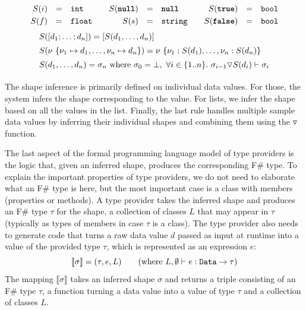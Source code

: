 \documentclass[fleqn,11pt]{report}
\newcommand{\kvd}[1]{\textnormal{\ttfamily\bfseries #1}}
\newcommand{\ident}[1]{\textnormal{\ttfamily #1}}
\theoremstyle{definition}
\newcommand{\sem}[1]{\llbracket #1 \rrbracket}
\newcommand{\semalt}[1]{S(#1)}
\begin{document}
\begin{equation*}
\begin{array}{rclcrclcrcl}
 \semalt{i} &=& \ident{int} && \semalt{\kvd{null}}  &=& \kvd{null} && \semalt{\kvd{true}} &=& \ident{bool}\\[0.3em]
 \semalt{f} &=& \ident{float} && \semalt{s} &=& \ident{string} && \semalt{\kvd{false}}  &=& \ident{bool}\\
\end{array}
\end{equation*}
\noindent
\vspace{-0.6em}
\begin{equation*}
\begin{array}{l}
 \semalt{[d_1; \ldots; d_n]} = [\semalt{d_1, \ldots, d_n}] \\[0.5em]
 \semalt{\nu~\{ \nu_1 \mapsto d_1, \ldots, \nu_n \mapsto d_n \}} = \nu~\{ \nu_1:\semalt{d_1}, \ldots, \nu_n :\semalt{d_n} \} \\[0.5em]
 \semalt{d_1, \ldots, d_n} = \sigma_n ~\textnormal{where}~ \sigma_0 = \bot,~ \forall i\in \{ 1.. n \}.~ \sigma_{i-1} \triangledown \semalt{d_i} \vdash \sigma_i \\[0.6em]
\end{array}
\end{equation*}
%
The shape inference is primarily defined on individual data values. For those, the system infers
the shape corresponding to the value. For lists, we infer the shape based on all the values in
the list. Finally, the last rule handles multiple sample data values by inferring their individual
shapes and combining them using the  $\triangledown$ function.

The last aspect of the formal programming language model of type providers is the logic that,
given an inferred shape, produces the corresponding F\# type. To explain the important
properties of type providers, we do not need to elaborate what an F\# type is here, but the most
important case is a class with members (properties or methods). A type provider takes the inferred
shape and produces an F\# type $\tau$ for the shape, a collection of classes $L$ that may appear
in $\tau$ (typically as types of members in case $\tau$ is a class). The type provider also needs
to generate code that turns a raw data value $d$ passed as input at runtime into a value of the
provided type $\tau$, which is represented as an expression $e$:
%
\begin{equation*}
\sem{\sigma} = (\tau, e, L) \qquad (\textnormal{where}~L,\emptyset \vdash e:\ident{Data}\rightarrow\tau)
\end{equation*}
%
The mapping $\sem{\sigma}$ takes an inferred shape $\sigma$ and returns a triple consisting of an
F\# type $\tau$, a function turning a data value into a value of type $\tau$ and a collection of
classes $L$.
\end{document}
